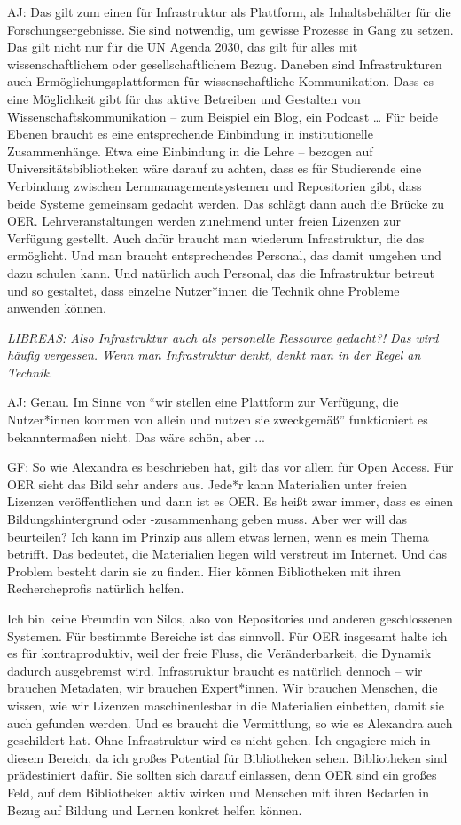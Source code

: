 \documentclass[a4paper,
fontsize=11pt,
oneside,
numbers=noperiodatend,
parskip=half-,
bibliography=totoc,
final
]{scrartcl}
\begin{document}
AJ: Das gilt zum einen für Infrastruktur als Plattform, als
Inhaltsbehälter für die Forschungsergebnisse. Sie sind notwendig, um
gewisse Prozesse in Gang zu setzen. Das gilt nicht nur für die UN Agenda
2030, das gilt für alles mit wissenschaftlichem oder gesellschaftlichem
Bezug. Daneben sind Infrastrukturen auch Ermöglichungsplattformen für
wissenschaftliche Kommunikation. Dass es eine Möglichkeit gibt für das
aktive Betreiben und Gestalten von Wissenschaftskommunikation -- zum
Beispiel ein Blog, ein Podcast \ldots{} Für beide Ebenen braucht es eine
entsprechende Einbindung in institutionelle Zusammenhänge. Etwa eine
Einbindung in die Lehre -- bezogen auf Universitätsbibliotheken wäre
darauf zu achten, dass es für Studierende eine Verbindung zwischen
Lernmanagementsystemen und Repositorien gibt, dass beide Systeme
gemeinsam gedacht werden. Das schlägt dann auch die Brücke zu OER.
Lehrveranstaltungen werden zunehmend unter freien Lizenzen zur Verfügung
gestellt. Auch dafür braucht man wiederum Infrastruktur, die das
ermöglicht. Und man braucht entsprechendes Personal, das damit umgehen
und dazu schulen kann. Und natürlich auch Personal, das die
Infrastruktur betreut und so gestaltet, dass einzelne Nutzer*innen die
Technik ohne Probleme anwenden können.

\emph{LIBREAS: Also Infrastruktur auch als personelle Ressource
gedacht?! Das wird häufig vergessen. Wenn man Infrastruktur denkt, denkt
man in der Regel an Technik.}

AJ: Genau. Im Sinne von \enquote{wir stellen eine Plattform zur
Verfügung, die Nutzer*innen kommen von allein und nutzen sie zweckgemäß}
funktioniert es bekanntermaßen nicht. Das wäre schön, aber ...

GF: So wie Alexandra es beschrieben hat, gilt das vor allem für Open
Access. Für OER sieht das Bild sehr anders aus. Jede*r kann Materialien
unter freien Lizenzen veröffentlichen und dann ist es OER. Es heißt zwar
immer, dass es einen Bildungshintergrund oder -zusammenhang geben muss.
Aber wer will das beurteilen? Ich kann im Prinzip aus allem etwas
lernen, wenn es mein Thema betrifft. Das bedeutet, die Materialien
liegen wild verstreut im Internet. Und das Problem besteht darin sie zu
finden. Hier können Bibliotheken mit ihren Rechercheprofis natürlich
helfen.

Ich bin keine Freundin von Silos, also von Repositories und anderen
geschlossenen Systemen. Für bestimmte Bereiche ist das sinnvoll. Für OER
insgesamt halte ich es für kontraproduktiv, weil der freie Fluss, die
Veränderbarkeit, die Dynamik dadurch ausgebremst wird. Infrastruktur
braucht es natürlich dennoch -- wir brauchen Metadaten, wir brauchen
Expert*innen. Wir brauchen Menschen, die wissen, wie wir Lizenzen
maschinenlesbar in die Materialien einbetten, damit sie auch gefunden
werden. Und es braucht die Vermittlung, so wie es Alexandra auch
geschildert hat. Ohne Infrastruktur wird es nicht gehen. Ich engagiere
mich in diesem Bereich, da ich großes Potential für Bibliotheken sehen.
Bibliotheken sind prädestiniert dafür. Sie sollten sich darauf
einlassen, denn OER sind ein großes Feld, auf dem Bibliotheken aktiv
wirken und Menschen mit ihren Bedarfen in Bezug auf Bildung und Lernen
konkret helfen können.
\end{document}
